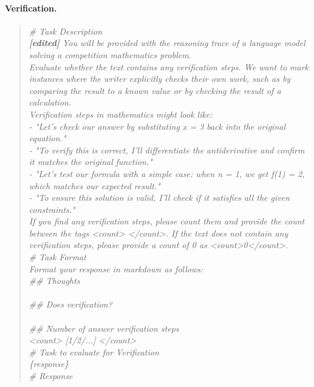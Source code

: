 \paragraph{Verification.}
\begin{quote}\small\itshape
\# Task Description\\
\textbf{[edited]} You will be provided with the reasoning trace of a language model solving a competition mathematics problem.\\
Evaluate whether the text contains any verification steps. We want to mark instances where the writer explicitly checks their own work, such as by comparing the result to a known value or by checking the result of a calculation.\\
\medskip
Verification steps in mathematics might look like:\\
- "Let's check our answer by substituting x = 3 back into the original equation."\\
- "To verify this is correct, I'll differentiate the antiderivative and confirm it matches the original function."\\
- "Let's test our formula with a simple case: when n = 1, we get f(1) = 2, which matches our expected result."\\
- "To ensure this solution is valid, I'll check if it satisfies all the given constraints."\\
\medskip
If you find any verification steps, please count them and provide the count between the tags <count> </count>. If the text does not contain any verification steps, please provide a count of 0 as <count>0</count>.\\
\medskip
\# Task Format\\
Format your response in markdown as follows:\\
\medskip
\#\# Thoughts\\
[Brief description describing what behavior was noticed and where answer verification may have occurred]\\
\medskip
\#\# Does verification?\\
[yes/no]\\
\medskip
\#\# Number of answer verification steps\\
<count> [1/2/...] </count>\\
\medskip
\# Task to evaluate for Verification\\
\{response\}\\
\medskip
\# Response\\
\end{quote}
